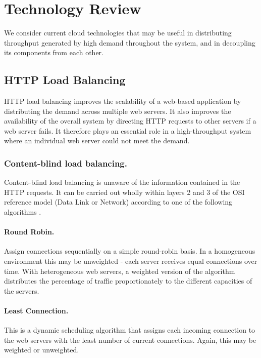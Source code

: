 \section{Technology Review}

We consider current cloud technologies that may be useful in distributing throughput generated by high demand throughout the system, and in decoupling its components from each other.

\subsection{HTTP Load Balancing}

HTTP load balancing improves the scalability of a web-based application by distributing the demand across multiple web servers.  It also improves the availability of the overall system by directing HTTP requests to other servers if a web server fails.  It therefore plays an essential role in a high-throughput system where an individual web server could not meet the demand.

\subsubsection{Content-blind load balancing.}  Content-blind load balancing is unaware of the information contained in the HTTP requests.  It can be carried out wholly within layers 2 and 3 of the OSI reference model \cite{day1983osi} (Data Link or Network) according to one of the following algorithms \cite{gilly2011up}.

\paragraph{Round Robin.} Assign connections sequentially on a simple round-robin basis.  In a homogeneous environment this may be unweighted - each server receives equal connections over time.  With heterogeneous web servers, a weighted version of the algorithm distributes the percentage of traffic proportionately to the different capacities of the servers.

\paragraph{Least Connection.}  This is a dynamic scheduling algorithm that assigns each incoming connection to the web servers with the least number of current connections. Again, this may be weighted or unweighted.

